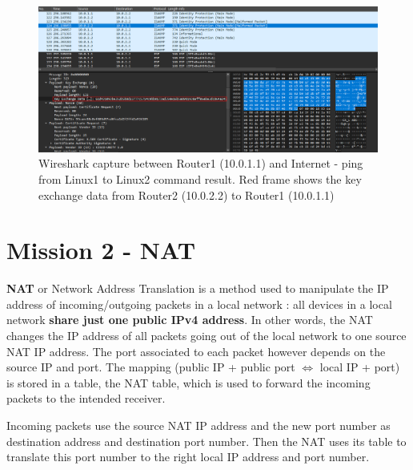 \documentclass[10pt,a4paper]{ULBreport}
\begin{document}
\begin{figure}[H]
    \centering
    \includegraphics[width=\textwidth]{wiresharkDHR2.png}
    \caption{Wireshark capture between Router1 (10.0.1.1) and Internet - ping from Linux1 to Linux2 command result. Red frame shows the key exchange data from Router2 (10.0.2.2) to Router1 (10.0.1.1)}
    \label{dhr2}
\end{figure}

\chapter{Mission 2 - NAT}





\textbf{NAT} or Network Address Translation is a method used to manipulate the IP address of incoming/outgoing packets in a local network : all devices in a local network \textbf{share just one public IPv4 address}. In other words, the NAT changes the IP address of all packets going out of the local network to one source NAT IP address. The port associated to each packet however depends on the source IP and port. The mapping (public IP + public port $\Leftrightarrow$ local IP + port) is stored in a table, the NAT table, which is used to forward the incoming packets to the intended receiver.

Incoming packets use the source NAT IP address and the new port number as destination address and destination port number. Then the NAT uses its table to translate this port number to the right local IP address and port number. 


\end{document}
